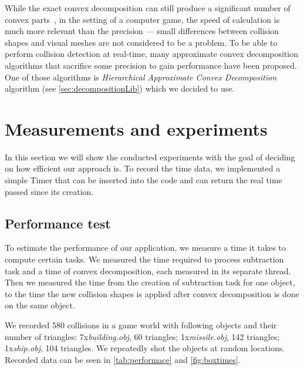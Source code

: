 While the exact convex decomposition can still produce a significant number of convex parts~\cite{convexDecomp}, in the setting of a computer game, the speed of calculation is much more relevant than the precision --- small differences between collision shapes and visual meshes are not considered to be a problem. To be able to perform collision detection at real-time, many approximate convex decomposition algorithms that sacrifice some precision to gain performance have been proposed. One of those algorithms is \emph{Hierarchical Approximate Convex Decomposition} algorithm (see \cref{sec:decompositionLib}) which we decided to use.

\section{Measurements and experiments}
\label{sec:testing}
In this section we will show the conducted experiments with the goal of deciding on how efficient our approach is.
To record the time data, we implemented a simple Timer that can be inserted into the code and can return the real time passed since its creation. 

\subsection{Performance test}
To estimate the performance of our application, we measure a time it takes to compute certain tasks. We measured the time required to process subtraction task and a time of convex decomposition, each measured in its separate thread. Then we measured the time from the creation of subtraction task for one object, to the time the new collision shapes is applied after convex decomposition is done on the same object.

We recorded 580 collisions in a game world with following objects and their number of triangles: 7x\emph{building.obj}, 60 triangles; 1x\emph{missile.obj}, 142 triangles; 1x\emph{ship.obj}, 104 triangles. We repeatedly shot the objects at random locations. Recorded data can be seen in \cref{tab:performace} and \cref{fig:boxtimes}.

